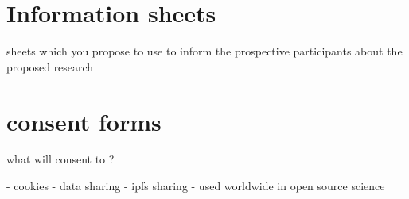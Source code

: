 

\section{Information sheets}
sheets  which you propose to use to inform the prospective participants about the proposed research



\section{consent forms}

what will consent to ?

- cookies
- data sharing
- ipfs sharing
- used worldwide in open source science
